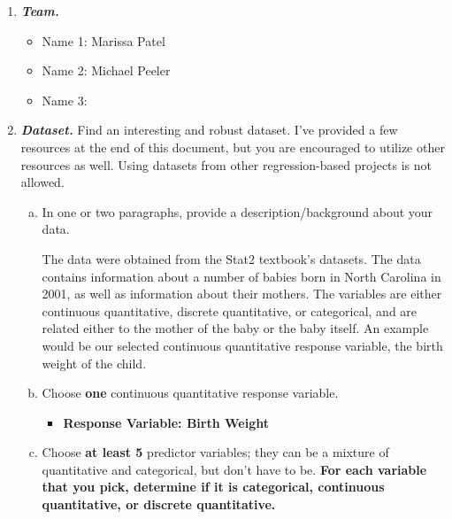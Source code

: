 \documentclass{article}\usepackage[]{graphicx}\usepackage[]{xcolor}
\begin{document}
\vspace{.2cm}
\begin{enumerate}[1.]
	\item \textbf{\textit{Team.}} 
	\begin{itemize}
		\vspace{.2cm}
		\item Name 1: Marissa Patel
		
		\vspace{.2cm}
		\item Name 2: Michael Peeler
		
		\vspace{.2cm}
		\item Name 3:
	\end{itemize}
		\vspace{.2cm}
		

\item \textbf{\textit{Dataset.}} Find an interesting and robust dataset. I've provided a few resources at the end of this document, but you are encouraged to utilize other resources as well. Using datasets from other regression-based projects is not allowed. 
	\vspace{.2cm}

\begin{enumerate}[(a)]
	\item In one or two paragraphs, provide a description/background about your data.
	
The data were obtained from the Stat2 textbook's datasets. The data contains information about a number of babies born in North Carolina in 2001, as well as information about their mothers. The variables are either continuous quantitative, discrete quantitative, or categorical, and are related either to the mother of the baby or the baby itself. An example would be our selected continuous quantitative response variable, the birth weight of the child.

	
	\item Choose \textbf{one} continuous quantitative response variable. 
	
	\vspace{.2cm}
	\begin{itemize}
		\item \textbf{Response Variable: Birth Weight}
	\end{itemize}
	\vspace{.2cm}
		
	\item Choose \textbf{at least 5} predictor variables; they can be a mixture of quantitative and categorical, but don't have to be. \textbf{For each variable that you pick, determine if it is categorical, continuous quantitative, or discrete quantitative.} 
	

\end{enumerate}
\end{enumerate}
\end{document}
